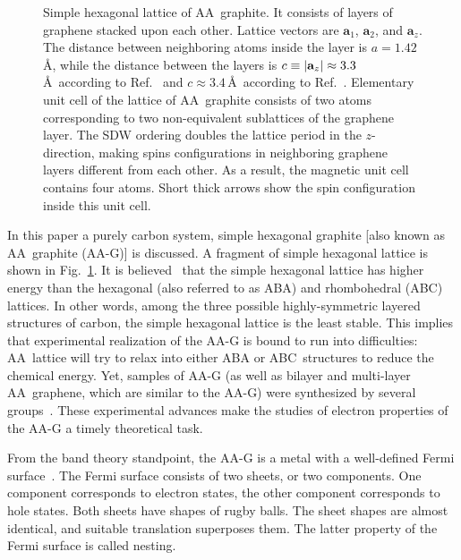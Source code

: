 \documentclass[prb,twocolumn,showpacs,aps,superscriptaddress,floatfix]{revtex4}
\begin{document}
\begin{figure}[t]
\caption{Simple hexagonal lattice of AA~graphite. It consists of layers of
graphene stacked upon each other. Lattice vectors are
$\mathbf{a}_1$,
$\mathbf{a}_2$,
and
$\mathbf{a}_z$.
The distance between neighboring atoms
inside the layer is
$a=1.42$\,\AA, while the distance between the layers is
$c\equiv|{\bf a}_z|\approx3.3$\,\AA\ according to
Ref.~ and
$c\approx 3.4$\,\AA\
according to Ref.~. Elementary unit cell of the
lattice of AA~graphite consists of two atoms corresponding to two
non-equivalent sublattices of the graphene layer. The SDW ordering doubles
the lattice period in the
$z$-direction,
making spins configurations in neighboring graphene layers different from
each other. As a result, the magnetic unit cell contains four atoms. Short
thick arrows show the spin configuration inside this unit
cell. 
\label{ris::aa_latt}}
\end{figure}

In this paper a purely carbon system, simple hexagonal graphite [also known
as AA~graphite (AA-G)] is discussed. A fragment of simple hexagonal lattice
is shown in
Fig.~\ref{ris::aa_latt}.
It is believed~\cite{aa_graphite_charlier1994}
that the simple hexagonal lattice has higher energy than the hexagonal
(also referred to as ABA) and rhombohedral (ABC) lattices. In other words,
among the three possible highly-symmetric layered structures of carbon, the
simple hexagonal lattice is the least stable. This implies that
experimental realization of the AA-G is bound to run into difficulties:
AA~lattice will try to relax into either ABA or ABC~structures to reduce
the chemical energy. Yet, samples of AA-G (as well as bilayer and
multi-layer AA~graphene, which are similar to the AA-G) were synthesized by
several
groups~\cite{aa_graphite_lee2008,liu_aa_exp2009,borysiuk2011_aa,
aa_graphit_roy1998}.
These experimental advances make the studies of electron properties of the
AA-G a timely theoretical task.

From the band theory standpoint, the AA-G is a metal with a well-defined
Fermi
surface~\cite{aa_graphite_charlier1994,aa_tb_charlier1991,
aa_abinit_charlier1992}.
The Fermi surface consists of two sheets, or two components. One component
corresponds to electron states, the other component corresponds to hole
states. Both sheets have shapes of rugby balls. The sheet shapes are
almost identical, and suitable translation superposes them. The latter
property of the Fermi surface is called nesting.
\end{document}
